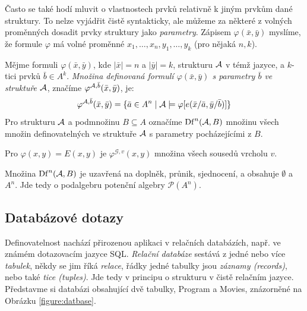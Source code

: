 Často se také hodí mluvit o vlastnostech prvků relativně k jiným prvkům dané struktury. To nelze vyjádřit čistě syntakticky, ale můžeme za některé z volných proměnných dosadit prvky struktury jako \emph{parametry}. Zápisem $\varphi(\bar x,\bar y)$ myslíme, že formule $\varphi$ má volné proměnné $x_1,\dots,x_n,y_1,\dots,y_k$ (pro nějaká $n,k$).

\begin{definition}
    Mějme formuli $\varphi(\bar x,\bar y)$, kde $|\bar x|=n$ a $|\bar y|=k$, strukturu $\mathcal{A}$ v témž jazyce, a $k$-tici prvků $\bar b\in A^k$. \emph{Množina definovaná formulí $\varphi(\bar x,\bar y)$ s parametry $\bar b$ ve struktuře $\mathcal{A}$}, značíme $\varphi^{\mathcal{A},\bar b}(\bar x,\bar y)$, je:
    $$
    \varphi^{\mathcal{A},\bar b}(\bar x,\bar y)=\{\bar a\in A^n\mid\mathcal{A}\models\varphi[e(\bar x/\bar a,\bar y/\bar b)]\}
    $$
    Pro strukturu $\mathcal{A}$ a podmnožinu $B\subseteq A$ označíme $\mathrm{Df}^n(\mathcal{A},B)$ množinu všech množin definovatelných ve struktuře $\mathcal{A}$ s parametry pocházejícími z $B$.
\end{definition}


\begin{example}
    Pro  $\varphi(x,y)=E(x,y)$ je $\varphi^{\mathcal G,v}(x,y)$ množina všech sousedů vrcholu $v$.
\end{example}

\begin{observation}
Množina $\mathrm{Df}^n(\mathcal{A},B)$ je uzavřená na doplněk, průnik, sjednocení, a obsahuje $\emptyset$ a $A^n$. Jde tedy o podalgebru potenční algebry $\mathcal P(A^n)$.
\end{observation}

\subsection{Databázové dotazy}

Definovatelnost nachází přirozenou aplikaci v relačních databázích, např. ve známém dotazovacím jazyce SQL. \emph{Relační databáze} sestává z jedné nebo více \emph{tabulek}, někdy se jim říká \emph{relace}, řádky jedné tabulky jsou \emph{záznamy (records)}, nebo také \emph{tice (tuples)}. Jde tedy v principu o strukturu v čistě relačním jazyce. Představme si databázi obsahující dvě tabulky, Program a Movies, znázorněné na Obrázku \ref{figure:datbase}.

